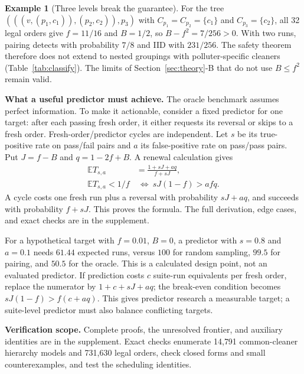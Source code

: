 \documentclass[conference,letterpaper]{IEEEtran}
\theoremstyle{definition}
\newtheorem{example}{Example}
\newcommand{\E}{\mathbb{E}}
\newcommand{\IIDp}{\textup{\textsc{IID}}}
\begin{document}
\begin{example}[Three levels break the guarantee]\label{ex:boundary}
For the tree $(((v,(p_1,c_1)),(p_2,c_2)),p_3)$ with $C_{p_1}=C_{p_2}=\{c_1\}$ and $C_{p_3}=\{c_2\}$, all 32 legal orders give $f=11/16$ and $B=1/2$, so $B-f^2=7/256>0$. With two runs, pairing detects with probability $7/8$ and \IIDp{} with $231/256$. The safety theorem therefore does not extend to nested groupings with polluter-specific cleaners (Table~\ref{tab:classify}). The limits of Section~\ref{sec:theory}-B that do not use $B\le f^2$ remain valid.
\end{example}

\textbf{What a useful predictor must achieve.}\label{sec:predictor}
The oracle benchmark assumes perfect information. To make it actionable, consider a fixed predictor for one target: after each passing fresh order, it either requests its reversal or skips to a fresh order. Fresh-order/predictor cycles are independent. Let $s$ be its true-positive rate on pass/fail pairs and $a$ its false-positive rate on pass/pass pairs. Put $J=f-B$ and $q=1-2f+B$. A renewal calculation gives
\begin{equation}\label{eq:predictor}
\begin{aligned}
\E T_{s,a}&=\frac{1+sJ+aq}{f+sJ},\\
\E T_{s,a}<1/f&\ \Longleftrightarrow\ sJ(1-f)>afq.
\end{aligned}
\end{equation}
A cycle costs one fresh run plus a reversal with probability $sJ+aq$, and succeeds with probability $f+sJ$. This proves the formula. The full derivation, edge cases, and exact checks are in the supplement.

For a hypothetical target with $f=0.01$, $B=0$, a predictor with $s=0.8$ and $a=0.1$ needs $61.44$ expected runs, versus $100$ for random sampling, $99.5$ for pairing, and $50.5$ for the oracle. This is a calculated design point, not an evaluated predictor. If prediction costs $c$ suite-run equivalents per fresh order, replace the numerator by $1+c+sJ+aq$; the break-even condition becomes $sJ(1-f)>f(c+aq)$. This gives predictor research a measurable target; a suite-level predictor must also balance conflicting targets.

\textbf{Verification scope.} Complete proofs, the unresolved frontier, and auxiliary identities are in the supplement. Exact checks enumerate 14{,}791 common-cleaner hierarchy models and 731{,}630 legal orders, check closed forms and small counterexamples, and test the scheduling identities.
\end{document}
